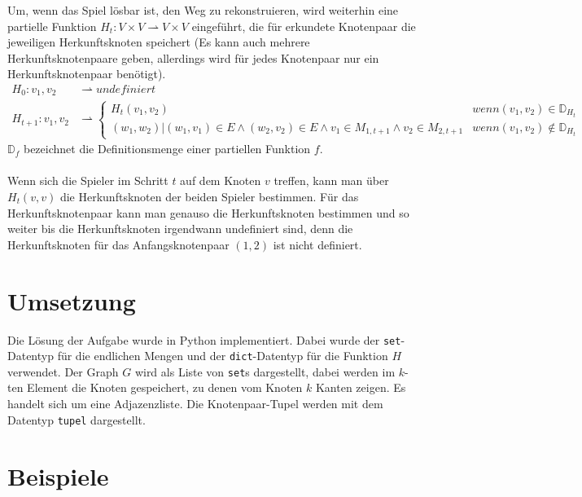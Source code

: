 \documentclass[a4paper,10pt,ngerman]{scrartcl}
\begin{document}
Um, wenn das Spiel lösbar ist, den Weg zu rekonstruieren, wird weiterhin eine partielle Funktion $H_t:V\times V \rightharpoonup V \times V$ eingeführt, die für erkundete Knotenpaar die jeweiligen Herkunftsknoten speichert (Es kann auch mehrere Herkunftsknotenpaare geben, allerdings wird für jedes Knotenpaar nur ein Herkunftsknotenpaar benötigt).
\begin{align*}
H_0: v_1,v_2 &\rightharpoonup undefiniert \\
H_ {t+1}: v_1,v_2 &\rightharpoonup \begin{cases}
H_{t}(v_1, v_2) &wenn (v_1,v_2) \in \mathbb{D}_{H_{t}}\\
(w_1, w_2)|(w_1,v_1) \in E \land (w_2,v_2) \in E \land v_1 \in M_{1,t+1} \land v_2 \in M_{2, t+1}&wenn (v_1,v_2) \notin \mathbb{D}_{H_{t}}
\end{cases}
\end{align*}
$\mathbb{D}_f$ bezeichnet die Definitionsmenge einer partiellen Funktion $f$. \\\\
Wenn sich die Spieler im Schritt $t$ auf dem Knoten $v$ treffen, kann man über $H_{t}(v,v)$ die Herkunftsknoten der beiden Spieler bestimmen. Für das Herkunftsknotenpaar kann man genauso die Herkunftsknoten bestimmen und so weiter bis die Herkunftsknoten irgendwann undefiniert sind, denn die Herkunftsknoten für das Anfangsknotenpaar $(1,2)$ ist nicht definiert.
\section{Umsetzung}
Die Lösung der Aufgabe wurde in Python implementiert. Dabei wurde der \lstinline|set|-Datentyp für die endlichen Mengen und der \lstinline|dict|-Datentyp für die Funktion $H$ verwendet. Der Graph $G$ wird als Liste von \lstinline|set|s dargestellt, dabei werden im $k$-ten Element die Knoten gespeichert, zu denen vom Knoten $k$ Kanten zeigen. Es handelt sich um eine Adjazenzliste. Die Knotenpaar-Tupel werden mit dem Datentyp \lstinline|tupel| dargestellt.
\section{Beispiele}
\end{document}
